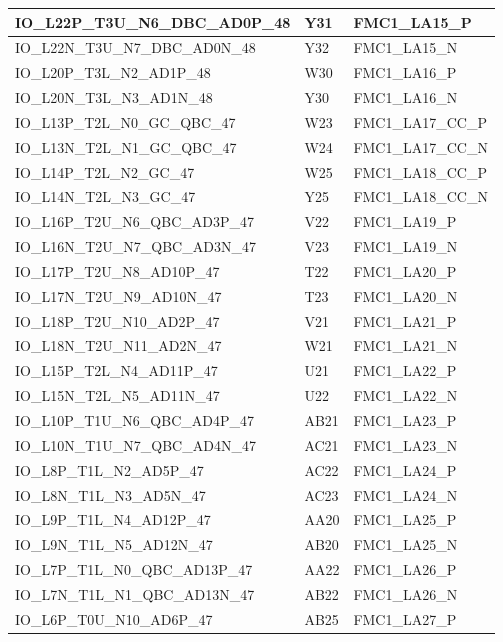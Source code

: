 \begin{footnotesize}
\begin{longtable}{|p{7cm}|p{1cm}|p{5cm}|}
		IO\_L22P\_T3U\_N6\_DBC\_AD0P\_48	&	Y31	&	FMC1\_LA15\_P	\\ \hline
		IO\_L22N\_T3U\_N7\_DBC\_AD0N\_48	&	Y32	&	FMC1\_LA15\_N	\\ \hline
		IO\_L20P\_T3L\_N2\_AD1P\_48	&	W30	&	FMC1\_LA16\_P	\\ \hline
		IO\_L20N\_T3L\_N3\_AD1N\_48	&	Y30	&	FMC1\_LA16\_N	\\ \hline
		IO\_L13P\_T2L\_N0\_GC\_QBC\_47	&	W23	&	FMC1\_LA17\_CC\_P	\\ \hline
		IO\_L13N\_T2L\_N1\_GC\_QBC\_47	&	W24	&	FMC1\_LA17\_CC\_N	\\ \hline
		IO\_L14P\_T2L\_N2\_GC\_47	&	W25	&	FMC1\_LA18\_CC\_P	\\ \hline
		IO\_L14N\_T2L\_N3\_GC\_47	&	Y25	&	FMC1\_LA18\_CC\_N	\\ \hline
		IO\_L16P\_T2U\_N6\_QBC\_AD3P\_47	&	V22	&	FMC1\_LA19\_P	\\ \hline
		IO\_L16N\_T2U\_N7\_QBC\_AD3N\_47	&	V23	&	FMC1\_LA19\_N	\\ \hline
		IO\_L17P\_T2U\_N8\_AD10P\_47	&	T22	&	FMC1\_LA20\_P	\\ \hline
		IO\_L17N\_T2U\_N9\_AD10N\_47	&	T23	&	FMC1\_LA20\_N	\\ \hline
		IO\_L18P\_T2U\_N10\_AD2P\_47	&	V21	&	FMC1\_LA21\_P	\\ \hline
		IO\_L18N\_T2U\_N11\_AD2N\_47	&	W21	&	FMC1\_LA21\_N	\\ \hline
		IO\_L15P\_T2L\_N4\_AD11P\_47	&	U21	&	FMC1\_LA22\_P	\\ \hline
		IO\_L15N\_T2L\_N5\_AD11N\_47	&	U22	&	FMC1\_LA22\_N	\\ \hline
		IO\_L10P\_T1U\_N6\_QBC\_AD4P\_47	&	AB21	&	FMC1\_LA23\_P	\\ \hline
		IO\_L10N\_T1U\_N7\_QBC\_AD4N\_47	&	AC21	&	FMC1\_LA23\_N	\\ \hline
		IO\_L8P\_T1L\_N2\_AD5P\_47	&	AC22	&	FMC1\_LA24\_P	\\ \hline
		IO\_L8N\_T1L\_N3\_AD5N\_47	&	AC23	&	FMC1\_LA24\_N	\\ \hline
		IO\_L9P\_T1L\_N4\_AD12P\_47	&	AA20	&	FMC1\_LA25\_P	\\ \hline
		IO\_L9N\_T1L\_N5\_AD12N\_47	&	AB20	&	FMC1\_LA25\_N	\\ \hline
		IO\_L7P\_T1L\_N0\_QBC\_AD13P\_47	&	AA22	&	FMC1\_LA26\_P	\\ \hline
		IO\_L7N\_T1L\_N1\_QBC\_AD13N\_47	&	AB22	&	FMC1\_LA26\_N	\\ \hline
		IO\_L6P\_T0U\_N10\_AD6P\_47	&	AB25	&	FMC1\_LA27\_P	\\ \hline

\end{longtable}
\end{footnotesize}
